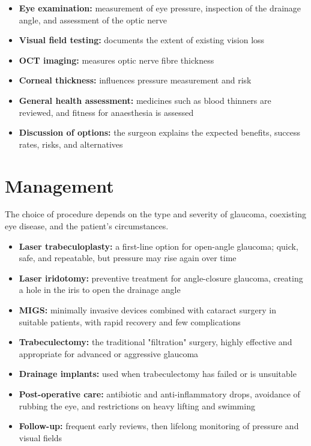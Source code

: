 \begin{itemize}
    \item \textbf{Eye examination:} measurement of eye pressure, inspection of the drainage angle, and assessment of the optic nerve
    \item \textbf{Visual field testing:} documents the extent of existing vision loss
    \item \textbf{OCT imaging:} measures optic nerve fibre thickness
    \item \textbf{Corneal thickness:} influences pressure measurement and risk
    \item \textbf{General health assessment:} medicines such as blood thinners are reviewed, and fitness for anaesthesia is assessed
    \item \textbf{Discussion of options:} the surgeon explains the expected benefits, success rates, risks, and alternatives
\end{itemize}

\section*{Management}
The choice of procedure depends on the type and severity of glaucoma, coexisting eye disease, and the patient's circumstances.

\begin{itemize}
    \item \textbf{Laser trabeculoplasty:} a first-line option for open-angle glaucoma; quick, safe, and repeatable, but pressure may rise again over time
    \item \textbf{Laser iridotomy:} preventive treatment for angle-closure glaucoma, creating a hole in the iris to open the drainage angle
    \item \textbf{MIGS:} minimally invasive devices combined with cataract surgery in suitable patients, with rapid recovery and few complications
    \item \textbf{Trabeculectomy:} the traditional "filtration" surgery, highly effective and appropriate for advanced or aggressive glaucoma
    \item \textbf{Drainage implants:} used when trabeculectomy has failed or is unsuitable
    \item \textbf{Post-operative care:} antibiotic and anti-inflammatory drops, avoidance of rubbing the eye, and restrictions on heavy lifting and swimming
    \item \textbf{Follow-up:} frequent early reviews, then lifelong monitoring of pressure and visual fields
\end{itemize}

